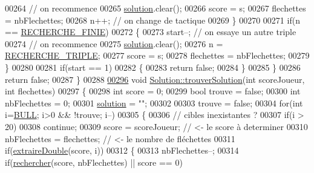 \begin{DoxyCode}
00264             \textcolor{comment}{// on recommence}
00265             \hyperlink{class_solution_a03b47dedfe8a8f8244f7e633cbaa30fb}{solution}.clear();
00266             score = s;
00267             flechettes = nbFlechettes;
00268             n++; \textcolor{comment}{// on change de tactique}
00269         \}
00270 
00271         \textcolor{keywordflow}{if}(n == \hyperlink{solution_8h_a40ef173938ecf3bea081d59950fedce7}{RECHERCHE\_FINIE})
00272         \{
00273             start--; \textcolor{comment}{// on essaye un autre triple}
00274             \textcolor{comment}{// on recommence}
00275             \hyperlink{class_solution_a03b47dedfe8a8f8244f7e633cbaa30fb}{solution}.clear();
00276             n = \hyperlink{solution_8h_a911c709f6e0d892d5aa2c1da0d3f2d02}{RECHERCHE\_TRIPLE};
00277             score = s;
00278             flechettes = nbFlechettes;
00279         \}
00280 
00281         \textcolor{keywordflow}{if}(start == 1)
00282         \{
00283             \textcolor{keywordflow}{return} \textcolor{keyword}{false};
00284         \}
00285     \}
00286     \textcolor{keywordflow}{return} \textcolor{keyword}{false};
00287 \}
00288 
\hyperlink{class_solution_a9ab0b0fd2b557f5abda8bd1a6da641e4}{00296} \textcolor{keywordtype}{void} \hyperlink{class_solution_a9ab0b0fd2b557f5abda8bd1a6da641e4}{Solution::trouverSolution}(\textcolor{keywordtype}{int} scoreJoueur, \textcolor{keywordtype}{int} flechettes)
00297 \{
00298     \textcolor{keywordtype}{int} score = 0;
00299     \textcolor{keywordtype}{bool} trouve = \textcolor{keyword}{false};
00300     \textcolor{keywordtype}{int} nbFlechettes = 0;
00301     \hyperlink{class_solution_a03b47dedfe8a8f8244f7e633cbaa30fb}{solution} = \textcolor{stringliteral}{""};
00302 
00303     trouve = \textcolor{keyword}{false};
00304     \textcolor{keywordflow}{for}(\textcolor{keywordtype}{int} i=\hyperlink{darts_8h_ac26e54839269cea6c170f2699af4ead2}{BULL}; i>0 && !trouve; i--)
00305     \{
00306         \textcolor{comment}{// cibles inexistantes ?}
00307         \textcolor{keywordflow}{if}(i > 20)
00308             \textcolor{keywordflow}{continue};
00309         score = scoreJoueur; \textcolor{comment}{// <- le score à determiner}
00310         nbFlechettes = flechettes; \textcolor{comment}{// <- le nombre de fléchettes}
00311         \textcolor{keywordflow}{if}(\hyperlink{class_solution_a34c3bf5ce00cdf428f2e07741806499d}{extraireDouble}(score, i))
00312         \{
00313             nbFlechettes--;
00314             \textcolor{keywordflow}{if}(\hyperlink{class_solution_a857b1b362fc0d5eb08e2eb7302dce27f}{rechercher}(score, nbFlechettes) || score == 0)

\end{DoxyCode}
